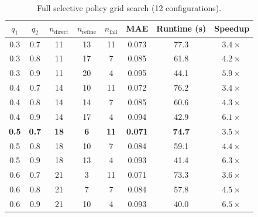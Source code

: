 \documentclass[11pt,a4paper]{article}
\begin{document}
\begin{table}[h]
\centering
\caption{Full selective policy grid search (12 configurations).}
\label{tab:full_grid}
\begin{tabular}{cccccccc}
\toprule
$q_1$ & $q_2$ & $n_\text{direct}$ & $n_\text{refine}$ & $n_\text{fall}$ &
MAE & Runtime (s) & Speedup \\
\midrule
0.3 & 0.7 & 11 & 13 & 11 & 0.073 & 77.3 & $3.4\times$ \\
0.3 & 0.8 & 11 & 17 &  7 & 0.085 & 61.8 & $4.2\times$ \\
0.3 & 0.9 & 11 & 20 &  4 & 0.095 & 44.1 & $5.9\times$ \\
0.4 & 0.7 & 14 & 10 & 11 & 0.072 & 76.2 & $3.4\times$ \\
0.4 & 0.8 & 14 & 14 &  7 & 0.085 & 60.6 & $4.3\times$ \\
0.4 & 0.9 & 14 & 17 &  4 & 0.094 & 42.9 & $6.1\times$ \\
\textbf{0.5} & \textbf{0.7} & \textbf{18} & \textbf{6} & \textbf{11} &
\textbf{0.071} & \textbf{74.7} & $\mathbf{3.5\times}$ \\
0.5 & 0.8 & 18 & 10 &  7 & 0.084 & 59.1 & $4.4\times$ \\
0.5 & 0.9 & 18 & 13 &  4 & 0.093 & 41.4 & $6.3\times$ \\
0.6 & 0.7 & 21 &  3 & 11 & 0.071 & 73.3 & $3.6\times$ \\
0.6 & 0.8 & 21 &  7 &  7 & 0.084 & 57.8 & $4.5\times$ \\
0.6 & 0.9 & 21 & 10 &  4 & 0.093 & 40.0 & $6.5\times$ \\
\bottomrule
\end{tabular}
\end{table}
\end{document}
